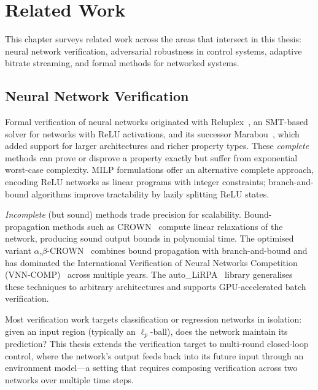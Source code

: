 \documentclass[thesis]{uofithesis} %
\begin{document}
\section{Related Work}
\label{chap:related}

    This chapter surveys related work across the areas that intersect
    in this thesis: neural network verification, adversarial robustness
    in control systems, adaptive bitrate streaming, and formal methods
    for networked systems.


    \subsection{Neural Network Verification}
    \label{sec:related-nnv}

    Formal verification of neural networks originated with
    Reluplex~\cite{reluplex}, an SMT-based solver for networks with
    ReLU activations, and its successor Marabou~\cite{marabou}, which
    added support for larger architectures and richer property types.
    These \emph{complete} methods can prove or disprove a property
    exactly but suffer from exponential worst-case complexity.
    MILP formulations offer an alternative complete approach,
    encoding ReLU networks as linear programs with integer constraints;
    branch-and-bound algorithms improve tractability by lazily
    splitting ReLU states.

    \emph{Incomplete} (but sound) methods trade precision for
    scalability.  Bound-propagation methods such as
    CROWN~\cite{crown} compute linear relaxations of the network,
    producing sound output bounds in polynomial time.  The optimised
    variant $\alpha$,$\beta$-CROWN~\cite{abcrown} combines
    bound propagation with branch-and-bound and has dominated the
    International Verification of Neural Networks Competition
    (VNN-COMP)~\cite{vnncomp} across multiple years.  The
    auto\_LiRPA~\cite{auto-lirpa} library generalises these
    techniques to arbitrary architectures and supports GPU-accelerated
    batch verification.

    Most verification work targets classification or regression
    networks in isolation: given an input region (typically an
    $\ell_p$-ball), does the network maintain its prediction?  This
    thesis extends the verification target to multi-round closed-loop
    control, where the network's output feeds back into its future
    input through an environment model---a setting that requires
    composing verification across two networks over multiple time
    steps.
\end{document}
